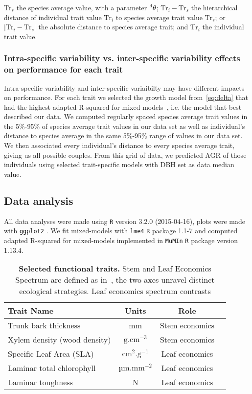 $\text{Tr}_s$ the species average value, with a parameter $\prescript{4}{}\theta$; $\text{Tr}_i - \text{Tr}_s$ the hierarchical distance of individual trait value $\text{Tr}_i$ to species average trait value $\text{Tr}_s$; or $\vert \text{Tr}_i - \text{Tr}_s \vert$ the absolute distance to species average trait; and $\text{Tr}_i$ the individual trait value.

\subsubsection*{Intra-specific variability vs. inter-specific variability effects on performance for each trait}

Intra-specific variability and inter-specific variaibilty may have different impacts on performance. For each trait we selected the growth model from~\autoref{eq:delta} that had the highest adapted R-squared for mixed models~\citep{nakagawa_general_2013}, i.e. the model that best described our data. 
We computed regularly spaced species average trait values in the 5\%-95\% of species average trait values in our data set as well as individual's distance to species average in the same 5\%-95\% range of values in our data set. We then associated every individual's distance to every species average trait, giving us all possible couples. From this grid of data, we predicted AGR of those individuals using selected trait-specific models with DBH set as data median value.

\subsection*{Data analysis}

All data analyses were made using \texttt{R} \citep{R_language} version 3.2.0 (2015-04-16), plots were made with \texttt{ggplot2} \citep{ggplot2_pkg}. We fit mixed-models with \texttt{lme4} \texttt{R} package \citep{lme4_pkg} 1.1-7 and computed adapted R-squared for mixed-models \citep{nakagawa_general_2013} implemented in \texttt{MuMIn} \texttt{R} package \citep{mumin_pkg} version 1.13.4.

\begin{table}
	\begin{center}
		\begin{tabular}{lccc}
		\hline
		Trait Name & Units & Role \\
		\hline
		Trunk bark thickness & mm & Stem economics \\
		Xylem density (wood density) & $\text{g}.\text{cm}^{-3}$ & Stem economics \\
		Specific Leaf Area (SLA) & $\text{cm}^2.\text{g}^{-1}$ & Leaf economics \\
		Laminar total chlorophyll & $\text{µm}.\text{mm}^{-2}$  & Leaf economics \\
		Laminar toughness & N & Leaf economics \\
		\hline
		\end{tabular}
		\caption{\textbf{Selected functional traits.} Stem and Leaf Economics Spectrum are defined as in~\citep{baraloto_decoupled_2010}, the two axes unravel distinct ecological strategies. Leaf economics spectrum contrasts} 
		\label{tab:seltraits}
	\end{center}
\end{table}
